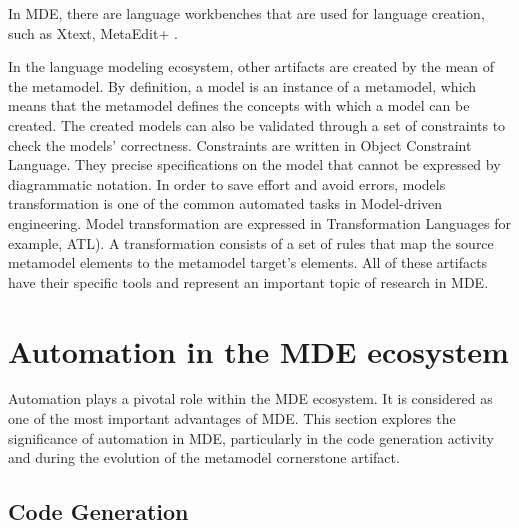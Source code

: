 In MDE, there are language workbenches that are used for language creation, such as Xtext, MetaEdit+ \cite{wortmann2020modeling}.



In the language modeling ecosystem, other artifacts are created by the mean of the metamodel. By definition, a model is an instance of a metamodel, which means that the metamodel defines the concepts with which a model can be created. The created models can also be validated through a set of constraints to check the models' correctness. Constraints are written in Object Constraint Language. They precise specifications on the model that cannot be  expressed by diagrammatic notation. In order to save effort and avoid errors, models transformation is one of the common automated tasks in Model-driven engineering. Model transformation are expressed in  Transformation Languages for example, ATL). A transformation consists of a set of rules that map the source metamodel elements to the metamodel target’s elements. All of these artifacts have their specific tools and represent an important topic of research in MDE.


\section{Automation in the MDE ecosystem}
\label{mde_automation}
 Automation plays a pivotal role within the MDE ecosystem. It is considered as one of the most important advantages of MDE. This section explores the significance of automation in MDE, particularly in the code generation activity and during the evolution of the metamodel cornerstone artifact.
 

\subsection{Code Generation}

